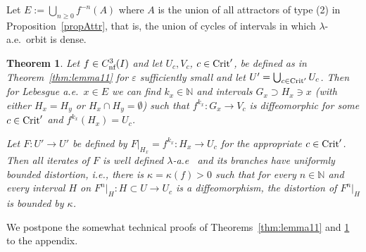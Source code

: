 \documentclass[12pt, psamsfonts, reqno]{amsart}
\newtheorem{theorem}{Theorem}
\begin{document}
Let $E := \bigcup_{n \geq 0} f^{-n}(A)$ where $A$ is the union of
all attractors of type (2) in Proposition~\ref{propAttr}, that is,
the union of cycles of intervals in which $\lambda$-a.e.\ orbit is
dense.

\begin{theorem}\label{thm:induced}
Let $f \in {C^3_{\text{\rm nf}}}(I)$ and let $U_c,V_c$, $c\in {\mathop{\rm Crit}\nolimits}'$, be
defined as in Theorem~\ref{thm:lemma11} for ${\varepsilon}$ sufficiently
small and let $U'=\bigcup_{c\in {\mathop{\rm Crit}\nolimits}'} U_c$. Then for
Lebesgue a.e.\ $x\in E$ we can find $k_x \in {{\mathbb N}}$ and intervals
$G_x \supset H_x \owns x$ (with either $H_x=H_y$ or $H_x\cap
H_y=\emptyset$) such that $f^{k_x}:G_x \to V_c$ is diffeomorphic
for some $c \in {\mathop{\rm Crit}\nolimits}'$ and $f^{k_x}(H_x) = U_c$.

Let $F:U' \to U'$ be defined
by $F|_{H_x} = f^{k_x}:H_x \to U_c$ for the appropriate $c \in
{\mathop{\rm Crit}\nolimits}'$. Then all iterates of $F$ is well defined $\lambda$-a.e \ and its
branches have uniformly bounded distortion, {{\em i.e., }} there is
$\kappa=\kappa(f)>0$ such that for every $n \in {{\mathbb N}}$ and every interval $H$
on $F^n|_H: H\subset U\to U_c$ is a diffeomorphism, the
distortion of  $F^n|_H$ is bounded by $\kappa$.
\end{theorem}

We postpone the somewhat technical proofs of
Theorems~\ref{thm:lemma11} and \ref{thm:induced} to the appendix.
\end{document}
